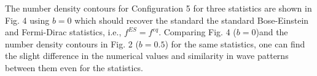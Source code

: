 \documentclass{rsproca}%
\begin{document}

The number density contours for Configuration 5 for three statistics are shown in Fig. 4 using $b=0$ which should recover the standard the standard Bose-Einstein and Fermi-Dirac statistics, i.e., $f^{ES}= f^{eq}$.  Comparing Fig. 4 ($b=0$)and the number density contours in Fig. 2 ($b=0.5$) for the same statistics, one can find the slight difference in the numerical values and similarity in wave patterns between them even for the statistics.
\end{document}
